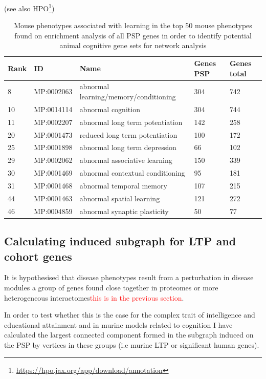 (see also HPO\footnote{\url{https://hpo.jax.org/app/download/annotation}})
\begin{table}[]
    \centering
    \setlength{\extrarowheight}{2pt}
    \begin{tabular}{lllll}
    \toprule
    Rank & ID & Name & Genes PSP & Genes total\\
    \midrule
        8 & MP:0002063 & abnormal learning/memory/conditioning & 304 & 742  \\
        10 & MP:0014114 & abnormal cognition & 304 & 744 \\
        11 & MP:0002207 & abnormal long term potentiation & 142 & 258 \\
        20 & MP:0001473 & reduced long term potentiation & 100 & 172 \\
        25 & MP:0001898 & abnormal long term depression & 66 & 102 \\
        29 & MP:0002062 & abnormal associative learning & 150 & 339 \\
        30 & MP:0001469 & abnormal contextual conditioning & 95 & 181 \\
        31 & MP:0001468 & abnormal temporal memory & 107 & 215\\
        44 & MP:0001463 & abnormal spatial learning & 121 & 272\\
        46 & MP:0004859 &abnormal synaptic plasticity & 50 & 77 \\
        \bottomrule
    \end{tabular}
    \caption[Mammalian phenotypes (MP) associated with learning and long term potentiation]{Mouse phenotypes associated with learning in the top 50 mouse phenotypes found on enrichment analysis of all PSP genes in order to identify potential animal cognitive gene sets for network analysis}
    \label{tab:mouse_learning}
\end{table}

\subsection{Calculating induced subgraph for LTP and cohort genes}
\label{sec:method_induced_subgraph}
It is hypothesised that disease phenotypes result from a perturbation in disease modules a group of genes found close together in proteomes or more heterogeneous interactomes\cite{barabasi2011network}\textcolor{red}{this is in the previous section}. 

In order to test whether this is the case for the complex trait of intelligence and educational attainment and in murine models related to cognition I have calculated the largest connected component formed in the subgraph induced on the PSP by vertices in these groups (i.e murine LTP or significant human genes).

